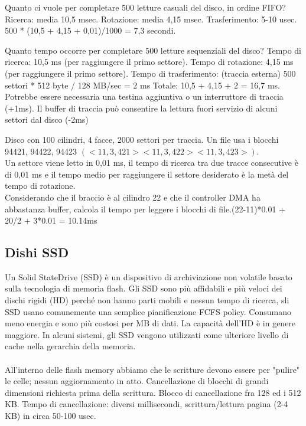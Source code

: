 \begin{example}
    Quanto ci vuole per completare 500 letture casuali del disco, in ordine FIFO? Ricerca: media 10,5 msec. Rotazione: media 4,15 msec. Trasferimento: 5-10 usec. 500 * (10,5 + 4,15 + 0,01)/1000 = 7,3 secondi.
\end{example}

\begin{example}
    Quanto tempo occorre per completare 500 letture sequenziali del disco? Tempo di ricerca: 10,5 ms (per raggiungere il primo settore). Tempo di rotazione: 4,15 ms (per raggiungere il primo settore). Tempo di trasferimento: (traccia esterna) 500 settori * 512 byte / 128 MB/sec = 2 ms Totale: 10,5 + 4,15 + 2 = 16,7 ms. \\
    Potrebbe essere necessaria una testina aggiuntiva o un interruttore di traccia (+1ms). Il buffer di traccia può consentire la lettura fuori servizio di alcuni settori dal disco (-2ms)
\end{example}


\begin{example}
    Disco con 100 cilindri, 4 facce, 2000 settori per traccia. Un file usa i blocchi 94421, 94422, 94423 \((<11,3,421> <11,3,422> <11,3,423>)\). 
    \\Un settore viene letto in 0,01 ms, il tempo di ricerca tra due tracce consecutive è di 0,01 ms e il tempo medio per raggiungere il settore desiderato è la metà del tempo di rotazione. 
    \\Considerando che il braccio è al cilindro 22 e che il controller DMA ha abbastanza buffer, calcola il tempo per leggere i blocchi di file.(22-11)*0.01 + 20/2 + 3*0.01 = 10.14ms
\end{example}

\subsection{Dishi SSD}
Un Solid StateDrive (SSD) è un dispositivo di archiviazione non volatile basato sulla tecnologia di memoria flash. Gli SSD sono più affidabili e più veloci dei dischi rigidi (HD) perché non hanno parti mobili e nessun tempo di ricerca, sli SSD usano comunemente una semplice pianificazione FCFS policy. 
Consumano meno energia e sono più costosi per MB di dati. La capacità dell'HD è in genere maggiore. In alcuni sistemi, gli SSD vengono utilizzati come ulteriore livello di cache nella gerarchia della memoria.
\\\\
All'interno delle flash memory abbiamo che le scritture devono essere per "pulire" le celle; nessun aggiornamento in atto. Cancellazione di blocchi di grandi dimensioni richiesta prima della scrittura.
Blocco di cancellazione fra 128 ed i 512 KB. Tempo di cancellazione: diversi millisecondi, scrittura/lettura pagina (2-4 KB) in circa 50-100 usec.

